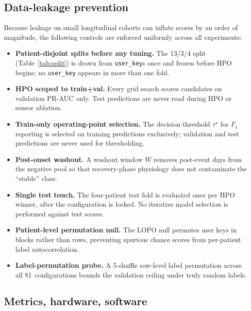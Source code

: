 \documentclass[11pt,a4paper]{article}
\newcommand{\prauc}{PR\nobreakdash-AUC}
\begin{document}
\subsection{Data-leakage prevention}\label{sec:setup-leakage}

Because leakage on small longitudinal cohorts can inflate scores by
an order of magnitude, the following controls are enforced uniformly
across all experiments:

\begin{itemize}[nosep,leftmargin=*]
  \item \textbf{Patient-disjoint splits before any tuning.}  The
        13/3/4 split (Table~\ref{tab:split}) is drawn from
        \texttt{user\_key}s once and frozen before HPO begins; no
        \texttt{user\_key} appears in more than one fold.
  \item \textbf{HPO scoped to train+val.}  Every grid search scores
        candidates on validation \prauc{} only.  Test predictions are
        never read during HPO or sensor ablation.
  \item \textbf{Train-only operating-point selection.}  The decision
        threshold $\tau^{\star}$ for $F_1$ reporting is selected on
        training predictions exclusively; validation and test
        predictions are never used for thresholding.
  \item \textbf{Post-onset washout.}  A washout window $W$ removes
        post-event days from the negative pool so that recovery-phase
        physiology does not contaminate the ``stable'' class.
  \item \textbf{Single test touch.}  The four-patient test fold is
        evaluated once per HPO winner, after the configuration is
        locked.  No iterative model selection is performed against
        test scores.
  \item \textbf{Patient-level permutation null.}  The LOPO null
        permutes user keys in blocks rather than rows, preventing
        spurious chance scores from per-patient label
        autocorrelation.
  \item \textbf{Label-permutation probe.}  A 5-shuffle row-level
        label permutation across all 81~configurations bounds the
        validation ceiling under truly random labels.
\end{itemize}

\subsection{Metrics, hardware, software}
\end{document}
